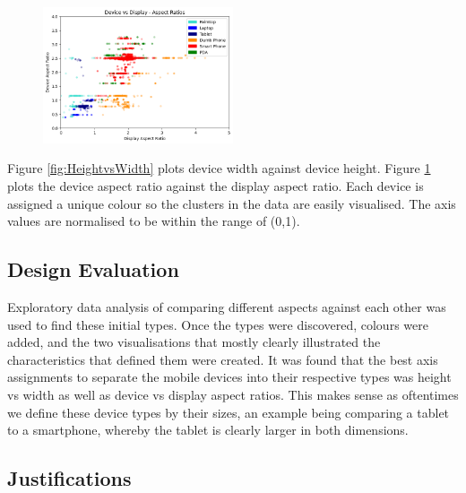 \documentclass[conference]{IEEEtran}
\begin{document}
\begin{figure}
    \centering
    \includegraphics[width=0.5\textwidth]{Visualisations/A/DevicevsDisplayColour.png}
    \caption{}
    \label{fig:DevicevsDisplay}
\end{figure}

Figure \ref{fig:HeightvsWidth} plots device width against device height. Figure \ref{fig:DevicevsDisplay} plots the device aspect ratio against the display aspect ratio. Each device is assigned a unique colour so the clusters in the data are easily visualised. The axis values are normalised to be within the range of (0,1).

\subsection{Design Evaluation}

Exploratory data analysis of comparing different aspects against each other was used to find these initial types.
Once the types were discovered, colours were added, and the two visualisations that mostly clearly illustrated the characteristics that defined them were created. It was found that the best axis assignments to separate the mobile devices into their respective types was height vs width as well as device vs display aspect ratios. This makes sense as oftentimes we define these device types by their sizes, an example being comparing a tablet to a smartphone, whereby the tablet is clearly larger in both dimensions. 

\subsection{Justifications}
\end{document}
